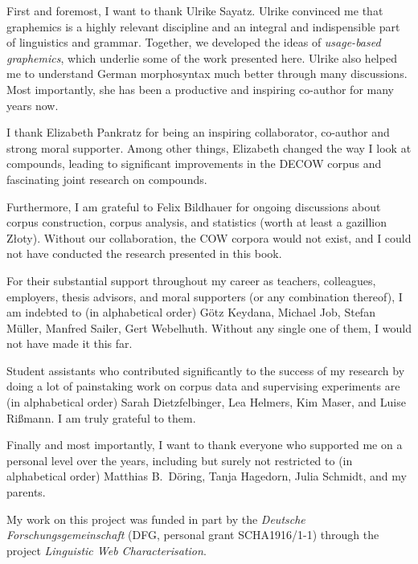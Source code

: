 
First and foremost, I want to thank Ulrike Sayatz.
Ulrike convinced me that graphemics is a highly relevant discipline and an integral and indispensible part of linguistics and grammar.
Together, we developed the ideas of \textit{usage-based graphemics}, which underlie some of the work presented here.
Ulrike also helped me to understand German morphosyntax much better through many discussions.
Most importantly, she has been a productive and inspiring co-author for many years now.

I thank Elizabeth Pankratz for being an inspiring collaborator, co-author and strong moral supporter.
Among other things, Elizabeth changed the way I look at compounds, leading to significant improvements in the DECOW corpus and fascinating joint research on compounds.

Furthermore, I am grateful to Felix Bildhauer for ongoing discussions about corpus construction, corpus analysis, and statistics (worth at least a gazillion Złoty).
Without our collaboration, the COW corpora would not exist, and I could not have conducted the research presented in this book.

For their substantial support throughout my career as teachers, colleagues, employers, thesis advisors, and moral supporters (or any combination thereof), I am indebted to (in alphabetical order) Götz Keydana, Michael Job, Stefan Müller, Manfred Sailer, Gert Webelhuth.
Without any single one of them, I would not have made it this far.

Student assistants who contributed significantly to the success of my research by doing a lot of painstaking work on corpus data and supervising experiments are (in alphabetical order) Sarah Dietzfelbinger, Lea Helmers, Kim Maser, and Luise Rißmann.
I am truly grateful to them.

Finally and most importantly, I want to thank everyone who supported me on a personal level over the years, including but surely not restricted to (in alphabetical order) Matthias B.\ Döring, Tanja Hagedorn, Julia Schmidt, and my parents.

My work on this project was funded in part by the \textit{Deutsche Forschungsgemeinschaft} (DFG, personal grant SCHA1916/1-1) through the project \textit{Linguistic Web Characterisation}.
